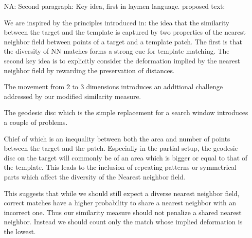 \documentclass[10pt,twocolumn,letterpaper]{article}
\newcommand{\colornote}[3]{{\color{#1}\bf{#2: #3}\normalfont}}
\newcommand{\colornote}[3]{}
\newcommand {\nadav}[1]{\colornote{red}{NA}{#1}}
\begin{document}
\nadav{Second paragraph: Key idea, first in laymen language. proposed text: 

We are inspired by the principles introduced in\cite{talmi2017template}: the idea that the similarity between the target and the template is captured by two properties of the nearest neighbor field between points of a target and a template patch. The first is that the diversity of NN matches forms a strong cue for template matching. The second key idea is to explicitly consider the deformation implied by the nearest neighbor field by rewarding the preservation of distances. 

The movement from 2 to 3 dimensions introduces an additional challenge addressed by our modified similarity measure.

The geodesic disc which is the simple replacement for a search window introduces a couple of problems. 

Chief of which is an inequality between both the area and number of points between the target and the patch. Especially in the partial setup, the geodesic disc on the target will commonly be of an area which is bigger or equal to that of the template. This leads to the  inclusion of repeating patterns or symmetrical parts which affect the diversity of the Nearest neighbor field.

This suggests that while we should still expect a diverse nearest neighbor field, correct matches have a higher probability to share a nearest neighbor with an incorrect one. Thus our similarity measure should not penalize a shared nearest neighbor. Instead we should count only the match whose implied deformation is the lowest.}
\end{document}
